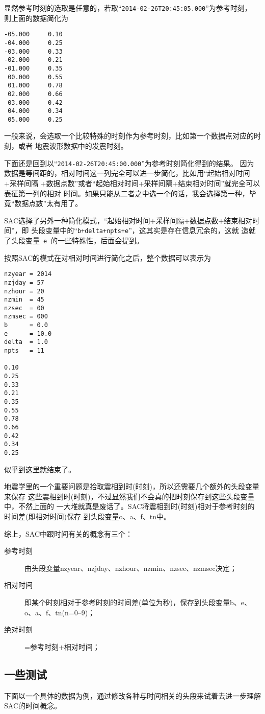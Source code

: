 显然参考时刻的选取是任意的，若取``\verb+2014-02-26T20:45:05.000+''为参考时刻，
则上面的数据简化为
\begin{verbatim}
-05.000     0.10
-04.000     0.25
-03.000     0.33
-02.000     0.21
-01.000     0.35
 00.000     0.55
 01.000     0.78
 02.000     0.66
 03.000     0.42
 04.000     0.34
 05.000     0.25
\end{verbatim}

一般来说，会选取一个比较特殊的时刻作为参考时刻，比如第一个数据点对应的时刻，或者
地震波形数据中的发震时刻。

下面还是回到以``\verb+2014-02-26T20:45:00.000+''为参考时刻简化得到的结果。
因为数据是等间距的，相对时间这一列完全可以进一步简化，比如用``起始相对时间+采样间隔
+数据点数''或者``起始相对时间+采样间隔+结束相对时间''就完全可以表征第一列的相对
时间。如果只能从二者之中选一个的话，我会选择第一种，毕竟``数据点数''太有用了。

SAC选择了另外一种简化模式，``起始相对时间+采样间隔+数据点数+结束相对时间''，即
头段变量中的``\verb|b+delta+npts+e|''，这其实是存在信息冗余的，这就
造就了头段变量~\verb+e+~的一些特殊性，后面会提到。

按照SAC的模式在对相对时间进行简化之后，整个数据可以表示为
\begin{verbatim}
nzyear = 2014
nzjday = 57
nzhour = 20
nzmin  = 45
nzsec  = 00
nzmsec = 000
b      = 0.0
e      = 10.0
delta  = 1.0
npts   = 11

0.10
0.25
0.33
0.21
0.35
0.55
0.78
0.66
0.42
0.34
0.25
\end{verbatim}

似乎到这里就结束了。

地震学里的一个重要问题是拾取震相到时(时刻)，所以还需要几个额外的头段变量来保存
这些震相到时(时刻)，不过显然我们不会真的把时刻保存到这些头段变量中，不然上面的
一大堆就真是废话了。SAC将震相到时(时刻)相对于参考时刻的时间差(即相对时间)保存
到头段变量o、a、f、tn中。

综上，SAC中跟时间有关的概念有三个：
\begin{description}
    \item [参考时刻] 由头段变量nzyear、nzjday、nzhour、nzmin、nzsec、nzmsec决定；
    \item [相对时间] 即某个时刻相对于参考时刻的时间差(单位为秒)，保存到头段变量b、e、
    o、a、f、tn(n=0--9)；
    \item [绝对时刻] =参考时刻+相对时间；
\end{description}

\subsection{一些测试}
下面以一个具体的数据为例，通过修改各种与时间相关的头段来试着去进一步理解SAC的时间概念。

